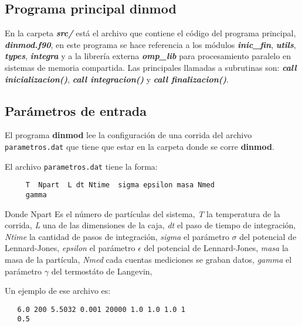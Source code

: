 \subsection{Programa principal dinmod}

En la carpeta \textbf{\textit{src/}} está el archivo que contiene el código del programa principal,
\textbf{\textit{dinmod.f90}}, en este programa se hace referencia a los módulos \textbf{\textit{inic\_fin}}, \textbf{\textit{utils}},
\textbf{\textit{types}}, \textbf{\textit{integra}} y a la librería externa \textbf{\textit{omp\_lib}} para procesamiento paralelo en sistemas de memoria compartida. 
Las principales llamadas a subrutinas son:
\textbf{\textit{call inicializacion()}},  \textbf{\textit{ call integracion()}} y \textbf{\textit{ call finalizacion()}}.



\subsection{Par\'ametros de entrada}

El programa \textbf{\textbf{dinmod}} lee la configuraci\'on de una corrida del 
archivo \texttt{parametros.dat} que tiene que estar en la carpeta donde se
corre \textbf{\textbf{dinmod}}.

El archivo \texttt{parametros.dat} tiene la forma: 

\begingroup
    \fontsize{9pt}{11pt}\selectfont
\begin{verbatim}
     T  Npart  L dt Ntime  sigma epsilon masa Nmed
     gamma
\end{verbatim}
\endgroup

Donde Npart
Es el número de partículas del sistema, \textit{T} la temperatura de la corrida,
\textit{L} una de las dimensiones de la caja, \textit{dt} el paso de tiempo de integración,
\textit{Ntime} la cantidad de pasos de integración,
\textit{sigma} el parámetro $\sigma$ del potencial de Lennard-Jones,
\textit{epsilon} el parámetro $\epsilon$ del potencial de Lennard-Jones,
\textit{masa} la masa de la partícula,
\textit{Nmed} cada cuentas mediciones se graban datos,
\textit{gamma} el parámetro $\gamma$ del termostáto de Langevin,

Un ejemplo de ese archivo es:

\begingroup
    \fontsize{9pt}{11pt}\selectfont
\begin{verbatim}
   6.0 200 5.5032 0.001 20000 1.0 1.0 1.0 1
   0.5
\end{verbatim}
\endgroup

